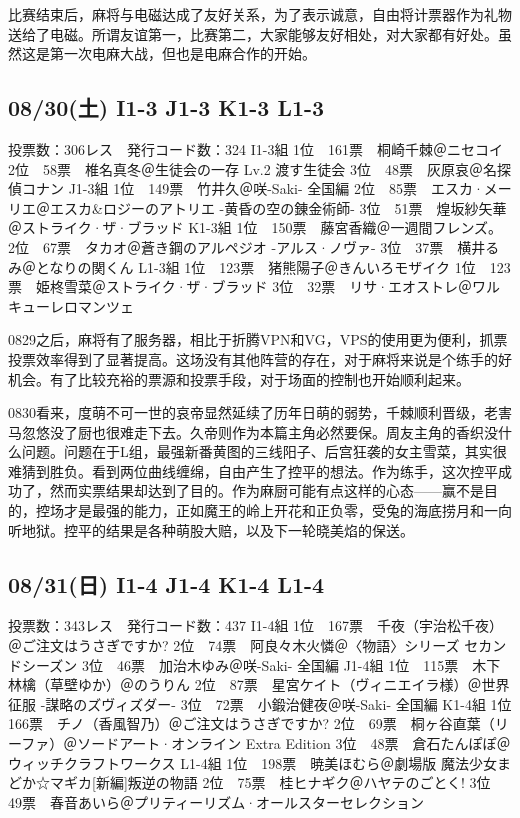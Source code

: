 比赛结束后，麻将与电磁达成了友好关系，为了表示诚意，自由将计票器作为礼物送给了电磁。所谓友谊第一，比赛第二，大家能够友好相处，对大家都有好处。虽然这是第一次电麻大战，但也是电麻合作的开始。

\subsection{08/30(土) I1-3 J1-3 K1-3 L1-3}

    投票数：306レス　発行コード数：324
    I1-3組
    1位　161票　桐崎千棘＠ニセコイ
    2位　58票　椎名真冬＠生徒会の一存 Lv.2 渡す生徒会
    3位　48票　灰原哀＠名探偵コナン
    J1-3組
    1位　149票　竹井久＠咲-Saki- 全国編
    2位　85票　エスカ·メーリエ＠エスカ\&ロジーのアトリエ -黄昏の空の錬金術師-
    3位　51票　煌坂紗矢華＠ストライク·ザ·ブラッド
    K1-3組
    1位　150票　藤宮香織＠一週間フレンズ。
    2位　67票　タカオ＠蒼き鋼のアルペジオ -アルス·ノヴァ-
    3位　37票　横井るみ＠となりの関くん
    L1-3組
    1位　123票　猪熊陽子＠きんいろモザイク
    1位　123票　姫柊雪菜＠ストライク·ザ·ブラッド
    3位　32票　リサ·エオストレ＠ワルキューレロマンツェ

0829之后，麻将有了服务器，相比于折腾VPN和VG，VPS的使用更为便利，抓票投票效率得到了显著提高。这场没有其他阵营的存在，对于麻将来说是个练手的好机会。有了比较充裕的票源和投票手段，对于场面的控制也开始顺利起来。

0830看来，度萌不可一世的哀帝显然延续了历年日萌的弱势，千棘顺利晋级，老害马忽悠没了厨也很难走下去。久帝则作为本篇主角必然要保。周友主角的香织没什么问题。问题在于L组，最强新番黄图的三线阳子、后宫狂袭的女主雪菜，其实很难猜到胜负。看到两位曲线缠绵，自由产生了控平的想法。作为练手，这次控平成功了，然而实票结果却达到了目的。作为麻厨可能有点这样的心态——赢不是目的，控场才是最强的能力，正如魔王的岭上开花和正负零，受兔的海底捞月和一向听地狱。控平的结果是各种萌股大赔，以及下一轮晓美焰的保送。

\subsection{08/31(日) I1-4 J1-4 K1-4 L1-4}

    投票数：343レス　発行コード数：437
    I1-4組
    1位　167票　千夜（宇治松千夜）＠ご注文はうさぎですか?
    2位　74票　阿良々木火憐＠〈物語〉シリーズ セカンドシーズン
    3位　46票　加治木ゆみ＠咲-Saki- 全国編
    J1-4組
    1位　115票　木下林檎（草壁ゆか）＠のうりん
    2位　87票　星宮ケイト（ヴィニエイラ様）＠世界征服 -謀略のズヴィズダー-
    3位　72票　小鍛治健夜＠咲-Saki- 全国編
    K1-4組
    1位　166票　チノ（香風智乃）＠ご注文はうさぎですか?
    2位　69票　桐ヶ谷直葉（リーファ）＠ソードアート·オンライン Extra Edition
    3位　48票　倉石たんぽぽ＠ウィッチクラフトワークス
    L1-4組
    1位　198票　暁美ほむら＠劇場版 魔法少女まどか☆マギカ[新編]叛逆の物語
    2位　75票　桂ヒナギク＠ハヤテのごとく!
    3位　49票　春音あいら＠プリティーリズム·オールスターセレクション

